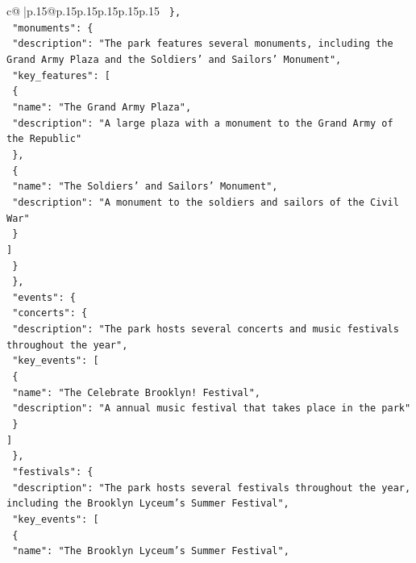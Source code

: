 \documentclass{article}
\begin{document}
{\begin{supertabular}{c@{$\;$}|p{.15\linewidth}@{}p{.15\linewidth}p{.15\linewidth}p{.15\linewidth}p{.15\linewidth}p{.15\linewidth}}
{{{\texttt{    \},} \\
\texttt{    "monuments": \{} \\
\texttt{      "description": "The park features several monuments, including the Grand Army Plaza and the Soldiers' and Sailors' Monument",} \\
\texttt{      "key\_features": {[}} \\
\texttt{        \{} \\
\texttt{          "name": "The Grand Army Plaza",} \\
\texttt{          "description": "A large plaza with a monument to the Grand Army of the Republic"} \\
\texttt{        \},} \\
\texttt{        \{} \\
\texttt{          "name": "The Soldiers' and Sailors' Monument",} \\
\texttt{          "description": "A monument to the soldiers and sailors of the Civil War"} \\
\texttt{        \}} \\
\texttt{      {]}} \\
\texttt{    \}} \\
\texttt{  \},} \\
\texttt{  "events": \{} \\
\texttt{    "concerts": \{} \\
\texttt{      "description": "The park hosts several concerts and music festivals throughout the year",} \\
\texttt{      "key\_events": {[}} \\
\texttt{        \{} \\
\texttt{          "name": "The Celebrate Brooklyn! Festival",} \\
\texttt{          "description": "A annual music festival that takes place in the park"} \\
\texttt{        \}} \\
\texttt{      {]}} \\
\texttt{    \},} \\
\texttt{    "festivals": \{} \\
\texttt{      "description": "The park hosts several festivals throughout the year, including the Brooklyn Lyceum's Summer Festival",} \\
\texttt{      "key\_events": {[}} \\
\texttt{        \{} \\
\texttt{          "name": "The Brooklyn Lyceum's Summer Festival",} \\
}}}
\end{supertabular}}
\end{document}
